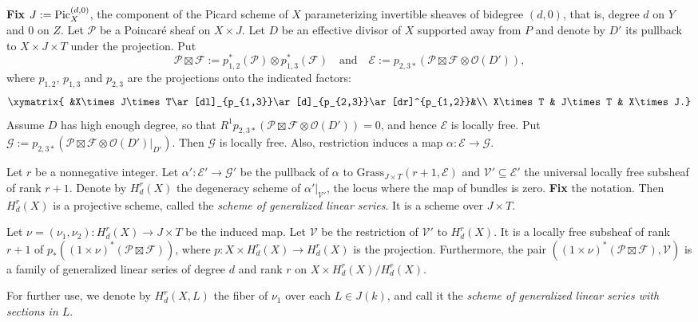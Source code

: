 \documentclass[a4paper,11pt]{amsart}
\theoremstyle{plain}
\theoremstyle{definition}
\theoremstyle{remark}
\def\L{\mathcal{L}}
\def\N{\mathcal{N}}
\def\V{\mathcal{V}}
\def\Pic{{\rm Pic}}
\def\P{\mathcal{P}}
\def\F{\mathcal{F}}
\def\E{\mathcal{E}}
\def\:{\colon}
\def\ox{\otimes}
\begin{document}
\textbf{Fix} $J:=\Pic^{(d,0)}_X$, the component of the Picard scheme of $X$ parameterizing invertible sheaves of bidegree $(d,0)$, that is, degree $d$ on $Y$ and $0$ on $Z$. Let $\P$ be a Poincar\'e sheaf on $X\times J$. Let $D$ be an effective divisor of $X$ supported away from $P$ and denote by $D'$ its pullback to $X\times J\times T$ under the
projection. Put 
\[
\P\boxtimes\F:=p_{1,2}^*(\P)\otimes p_{1,3}^*(\F)\quad\text{and}\quad
\mathcal E:=p_{2,3\ast}\left(\P\boxtimes\F\otimes\mathcal O(D')\right),
\]
where $p_{1,2}$, $p_{1,3}$ and $p_{2,3}$ are the projections onto the indicated factors:
\begin{equation}\label{Diag:H}
\xymatrix{
&X\times J\times T\ar[dl]_{p_{1,3}}\ar[d]_{p_{2,3}}\ar[dr]^{p_{1,2}}&\\
X\times T & J\times T & X\times J.}
\end{equation}
Assume $D$ has high enough degree, so that $R^1p_{2,3\ast}\left(\P\boxtimes\F\otimes\mathcal O(D')\right)=0$, and hence $\mathcal E$ is locally free. Put 
$\mathcal G:=p_{2,3\ast}(\P\boxtimes\F\otimes\mathcal O(D')|_{D'})$. Then $\mathcal G$ is locally free. Also, restriction induces a map $\alpha\colon\mathcal E\to\mathcal G$. 

Let $r$ be a nonnegative integer. Let $\alpha'\colon\mathcal E'\to\mathcal G'$ be the pullback of $\alpha$ to 
$\text{Grass}_{J\times T}(r+1,\E)$ and $\mathcal V'\subseteq\mathcal E'$ the universal locally free subsheaf of rank $r+1$. Denote by $H^{r}_d(X)$ the degeneracy scheme of $\alpha'|_{\mathcal V'}$, the locus where the map of bundles is zero. \textbf{Fix} the notation. Then $H^r_d(X)$ is a projective scheme, called the \emph{scheme of generalized linear series}.  It is a scheme over $J\times T$.

Let $\nu=(\nu_1,\nu_2)\: H^r_d(X)\to J\times T$ be the induced map. Let $\mathcal V$ be the restriction of $\mathcal V'$ to $H^r_d(X)$. It is a locally free subsheaf of rank $r+1$ of $p_*((1\times\nu)^*(\P\boxtimes\F))$, where $p:X\times H^{r}_d(X)\rightarrow H^{r}_d(X)$ is the projection. Furthermore, the pair 
$((1\times\nu)^*(\P\boxtimes\F),\mathcal V)$ is a family of generalized linear series of degree $d$ and rank $r$ on $X\times H^r_d(X)/H^r_d(X)$.

For further use, we denote by $H^r_d(X,L)$ the fiber of $\nu_1$ over each $L\in J(k)$, and call it the \emph{scheme of generalized linear series with sections in $L$}.  

\end{document}
